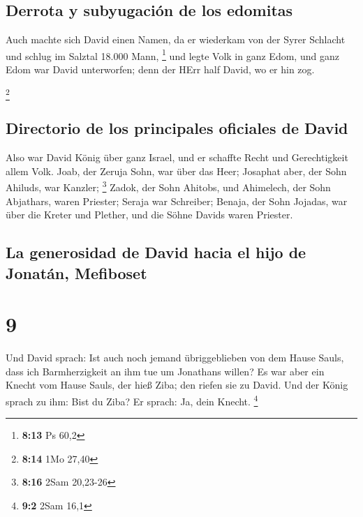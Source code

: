 \hypertarget{derrota-y-subyugaciuxf3n-de-los-edomitas}{%
\subsection{Derrota y subyugación de los
edomitas}\label{derrota-y-subyugaciuxf3n-de-los-edomitas}}

 Auch machte sich David einen Namen, da er wiederkam von
der Syrer Schlacht und schlug im Salztal 18.000 Mann, \footnote{\textbf{8:13}
  Ps 60,2}  und legte Volk in ganz Edom, und ganz Edom
war David unterworfen; denn der HErr half David, wo er hin zog.

\footnote{\textbf{8:14} 1Mo 27,40}

\hypertarget{directorio-de-los-principales-oficiales-de-david}{%
\subsection{Directorio de los principales oficiales de
David}\label{directorio-de-los-principales-oficiales-de-david}}

 Also war David König über ganz Israel, und er schaffte
Recht und Gerechtigkeit allem Volk.  Joab, der Zeruja
Sohn, war über das Heer; Josaphat aber, der Sohn Ahiluds, war Kanzler;
\footnote{\textbf{8:16} 2Sam 20,23-26}  Zadok, der Sohn
Ahitobs, und Ahimelech, der Sohn Abjathars, waren Priester; Seraja war
Schreiber;  Benaja, der Sohn Jojadas, war über die Kreter
und Plether, und die Söhne Davids waren Priester.

\hypertarget{la-generosidad-de-david-hacia-el-hijo-de-jonatuxe1n-mefiboset}{%
\subsection{La generosidad de David hacia el hijo de Jonatán,
Mefiboset}\label{la-generosidad-de-david-hacia-el-hijo-de-jonatuxe1n-mefiboset}}

\hypertarget{section-8}{%
\section{9}\label{section-8}}

 Und David sprach: Ist auch noch jemand übriggeblieben von
dem Hause Sauls, dass ich Barmherzigkeit an ihm tue um Jonathans willen?
 Es war aber ein Knecht vom Hause Sauls, der hieß Ziba;
den riefen sie zu David. Und der König sprach zu ihm: Bist du Ziba? Er
sprach: Ja, dein Knecht. \footnote{\textbf{9:2} 2Sam 16,1}


